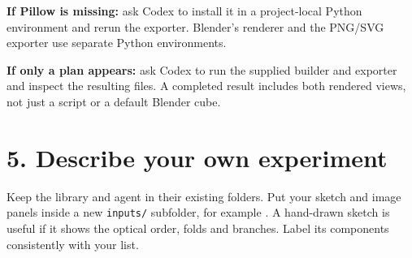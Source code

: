 \documentclass[11pt,a4paper]{article}
\begin{document}
\textbf{If Pillow is missing:} ask Codex to install it in a project-local Python environment and rerun the exporter. Blender's renderer and the PNG/SVG exporter use separate Python environments.

\textbf{If only a plan appears:} ask Codex to run the supplied builder and exporter and inspect the resulting files. A completed result includes both rendered views, not just a script or a default Blender cube.
\clearpage
\section*{5. Describe your own experiment}
Keep the library and agent in their existing folders. Put your sketch and image panels inside a new \texttt{inputs/} subfolder, for example . A hand-drawn sketch is useful if it shows the optical order, folds and branches. Label its components consistently with your list.
\end{document}
